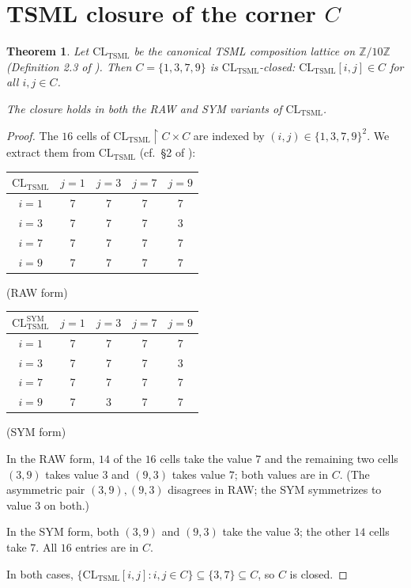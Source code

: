 \documentclass[11pt,reqno]{amsart}
\theoremstyle{plain}
\newtheorem{theorem}{Theorem}[section]
\theoremstyle{definition}
\theoremstyle{remark}
\newcommand{\Z}{\mathbb{Z}}
\newcommand{\TSML}{\mathrm{TSML}}
\begin{document}
\section{TSML closure of the corner $C$}
\label{sec:closure}

\begin{theorem}\label{thm:closure}
Let $\mathrm{CL}_\TSML$ be the canonical TSML composition lattice on
$\Z/10\Z$ (Definition 2.3 of \cite{SandersForcing}). Then
$C = \{1, 3, 7, 9\}$ is $\mathrm{CL}_\TSML$-closed:
$\mathrm{CL}_\TSML[i, j] \in C$ for all $i, j \in C$.

The closure holds in both the RAW and SYM variants of
$\mathrm{CL}_\TSML$.
\end{theorem}

\begin{proof}
The $16$ cells of $\mathrm{CL}_\TSML \restriction C \times C$ are
indexed by $(i, j) \in \{1, 3, 7, 9\}^2$. We extract them from
$\mathrm{CL}_\TSML$ (cf.\ \S 2 of \cite{SandersForcing}):

\begin{center}
\begin{tabular}{c|cccc}
$\mathrm{CL}_\TSML$ & $j=1$ & $j=3$ & $j=7$ & $j=9$ \\
\hline
$i=1$ & 7 & 7 & 7 & 7 \\
$i=3$ & 7 & 7 & 7 & 3 \\
$i=7$ & 7 & 7 & 7 & 7 \\
$i=9$ & 7 & 7 & 7 & 7 \\
\end{tabular}
\quad (RAW form)
\end{center}

\begin{center}
\begin{tabular}{c|cccc}
$\mathrm{CL}_\TSML^{\text{SYM}}$ & $j=1$ & $j=3$ & $j=7$ & $j=9$ \\
\hline
$i=1$ & 7 & 7 & 7 & 7 \\
$i=3$ & 7 & 7 & 7 & 3 \\
$i=7$ & 7 & 7 & 7 & 7 \\
$i=9$ & 7 & 3 & 7 & 7 \\
\end{tabular}
\quad (SYM form)
\end{center}

In the RAW form, $14$ of the $16$ cells take the value $7$ and the
remaining two cells $(3, 9)$ takes value $3$ and $(9, 3)$ takes value
$7$; both values are in $C$. (The asymmetric pair $(3, 9), (9, 3)$
disagrees in RAW; the SYM symmetrizes to value $3$ on both.)

In the SYM form, both $(3, 9)$ and $(9, 3)$ take the value $3$;
the other $14$ cells take $7$. All $16$ entries are in $C$.

In both cases, $\{ \mathrm{CL}_\TSML[i, j] : i, j \in C \} \subseteq \{3, 7\} \subseteq C$, so $C$ is closed.
\end{proof}
\end{document}
